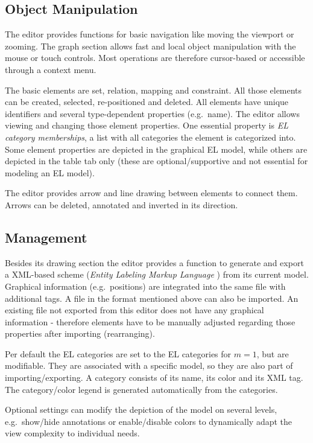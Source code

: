 \documentclass[twoside, openright, 12pt]{book}
\begin{document}
\subsection{Object Manipulation}
\label{editor_object_manipulation}
The editor provides functions for basic navigation like moving the viewport or zooming.
The graph section allows fast and local object manipulation with the mouse or touch controls.
Most operations are therefore cursor-based or accessible through a context menu.

The basic elements are set, relation, mapping and constraint.
All those elements can be created, selected, re-positioned and deleted.
All elements have unique identifiers and several type-dependent properties (e.g.\ name).
The editor allows viewing and changing those element properties.
One essential property is \textit{EL category memberships}, a list with all categories the element is categorized into.
Some element properties are depicted in the graphical EL model, while others are depicted in the table tab only (these are optional/supportive and not essential for modeling an EL model).

The editor provides arrow and line drawing between elements to connect them.
Arrows can be deleted, annotated and inverted in its direction.



\subsection{Management}
\label{editor_management}
Besides its drawing section the editor provides a function to generate and export a XML-based scheme (\textit{Entity Labeling Markup Language} \citep{Amthor18}) from its current model.
Graphical information (e.g.\ positions) are integrated into the same file with additional tags.
A file in the format mentioned above can also be imported.
An existing file not exported from this editor does not have any graphical information - therefore elements have to be manually adjusted regarding those properties after importing (rearranging).

Per default the EL categories are set to the EL categories for $m=1$, but are modifiable.
They are associated with a specific model, so they are also part of importing/exporting.
A category consists of its name, its color and its XML tag.
The category/color legend is generated automatically from the categories.

Optional settings can modify the depiction of the model on several levels, e.g.\ show/hide annotations or enable/disable colors to dynamically adapt the view complexity to individual needs.
\end{document}
